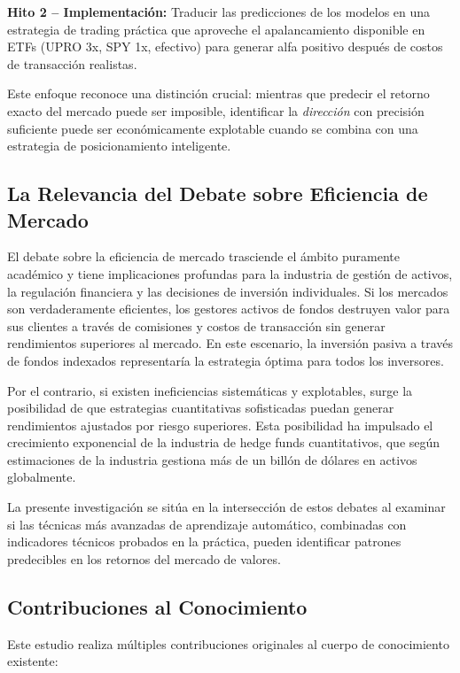 \documentclass[11pt,a4paper]{article}
\begin{document}
\textbf{Hito 2 -- Implementaci\'on:} Traducir las predicciones de los modelos en una estrategia de trading pr\'actica que aproveche el apalancamiento disponible en ETFs (UPRO 3x, SPY 1x, efectivo) para generar alfa positivo despu\'es de costos de transacci\'on realistas.

Este enfoque reconoce una distinci\'on crucial: mientras que predecir el retorno exacto del mercado puede ser imposible, identificar la \textit{direcci\'on} con precisi\'on suficiente puede ser econ\'omicamente explotable cuando se combina con una estrategia de posicionamiento inteligente.

\subsection{La Relevancia del Debate sobre Eficiencia de Mercado}

El debate sobre la eficiencia de mercado trasciende el \'ambito puramente acad\'emico y tiene implicaciones profundas para la industria de gesti\'on de activos, la regulaci\'on financiera y las decisiones de inversi\'on individuales. Si los mercados son verdaderamente eficientes, los gestores activos de fondos destruyen valor para sus clientes a trav\'es de comisiones y costos de transacci\'on sin generar rendimientos superiores al mercado. En este escenario, la inversi\'on pasiva a trav\'es de fondos indexados representar\'ia la estrategia \'optima para todos los inversores.

Por el contrario, si existen ineficiencias sistem\'aticas y explotables, surge la posibilidad de que estrategias cuantitativas sofisticadas puedan generar rendimientos ajustados por riesgo superiores. Esta posibilidad ha impulsado el crecimiento exponencial de la industria de hedge funds cuantitativos, que seg\'un estimaciones de la industria gestiona m\'as de un bill\'on de d\'olares en activos globalmente.

La presente investigaci\'on se sit\'ua en la intersecci\'on de estos debates al examinar si las t\'ecnicas m\'as avanzadas de aprendizaje autom\'atico, combinadas con indicadores t\'ecnicos probados en la pr\'actica, pueden identificar patrones predecibles en los retornos del mercado de valores.

\subsection{Contribuciones al Conocimiento}

Este estudio realiza m\'ultiples contribuciones originales al cuerpo de conocimiento existente:
\end{document}

